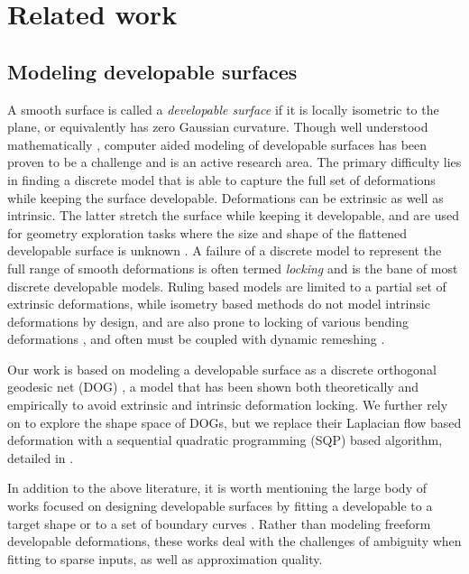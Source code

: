 
\section{Related work}
\subsection{Modeling developable surfaces}
A smooth surface is called a \textit{developable surface} if it is locally isometric to the plane, or equivalently has zero Gaussian curvature. Though well understood mathematically \cite{do_carmo,spivak,computational_line}, computer aided modeling of developable surfaces has been proven to be a challenge and is an active research area. The primary difficulty lies in finding a discrete model that is able to capture the full set of deformations while keeping the surface developable. Deformations can be extrinsic as well as intrinsic. The latter stretch the surface while keeping it developable, and are used for geometry exploration tasks where the size and shape of the flattened developable surface is unknown \cite{conical,pottmann_new,rabi2018shape}. A failure of a discrete model to represent the full range of smooth deformations is often termed \emph{locking} \cite{solomon,locking1} and is the bane of most discrete developable models. Ruling based models \cite{conical,curved_folding_kilian,pottmann_new,stein_dev,solomon} are limited to a partial set of extrinsic deformations, while isometry based methods \cite{grin_shells,shells, goldenthal2007efficient,froh_botsch} do not model intrinsic deformations by design, and are also prone to locking of various bending deformations \cite{locking1,locking2}, and often must be coupled with dynamic remeshing \cite{narain2012adaptive,StringActuated:2017,Narain,Wang}.

Our work is based on modeling a developable surface as a discrete orthogonal geodesic net (DOG) \cite{rabi18}, a model that has been shown both theoretically and empirically to avoid extrinsic and intrinsic deformation locking. 
We further rely on \cite{rabi2018shape} to explore the shape space of DOGs, but we replace their Laplacian flow based deformation with a sequential quadratic programming (SQP) based algorithm, detailed in . 

In addition to the above literature, it is worth mentioning the large body of works focused on designing developable surfaces by fitting a developable to a target shape \cite{pottmann_approx,pottmann_new,stein_dev} or to a set of boundary curves \cite{sheffer,Frey1,Frey2,bo2019multi}. Rather than modeling freeform developable deformations, these works deal with the challenges of ambiguity when fitting to sparse inputs, as well as approximation quality. 

